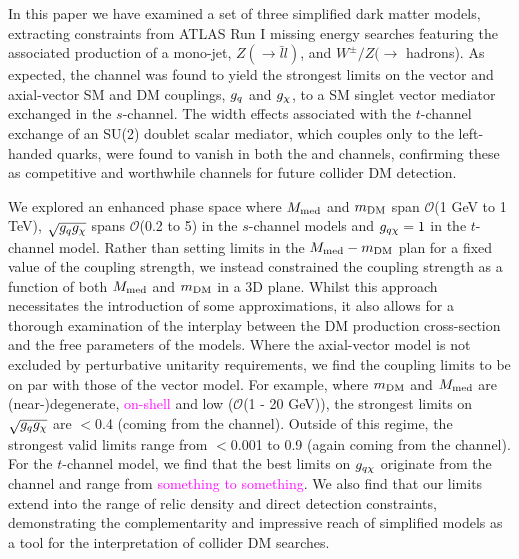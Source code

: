 
In this paper we have examined a set of three simplified dark matter models, extracting constraints from ATLAS Run I missing energy searches featuring the associated production of a mono-jet, $Z(\rightarrow \bar l l)$, and $W^\pm/Z (\rightarrow$ hadrons). As expected, the \monojet channel was found to yield the strongest limits on the vector and axial-vector SM and DM couplings, $g_q$ and $g_{\chi}$, to a SM singlet vector mediator exchanged in the $s$-channel. The width effects associated with the $t$-channel exchange of an SU(2) doublet scalar mediator, which couples only to the left-handed quarks, were found to vanish in both the \monoZ and \monoWZ channels, confirming these as competitive and worthwhile channels for future collider DM detection. 

We explored an enhanced phase space where $M_{\mathrm{med}}$ and $m_{\mathrm{DM}}$ span $\mathcal{O}$(1 GeV to 1 TeV), $\sqrt{g_qg_{\chi}}$ spans $\mathcal{O}$(0.2 to 5) in the $s$-channel models and $g_{q \chi}= 1$ in the $t$-channel model. Rather than setting limits in the $M_{\mathrm{med}} - m_{\mathrm{DM}}$ plan for a fixed value of the coupling strength, we instead constrained the coupling strength as a function of both $M_{\mathrm{med}}$ and $m_{\mathrm{DM}}$ in a 3D plane. Whilst this approach necessitates the introduction of some approximations, it also allows for a thorough examination of the interplay between the DM production cross-section and the free parameters of the models. Where the axial-vector model is not excluded by perturbative unitarity requirements, we find the coupling limits to be on par with those of the vector model. For example, where $m_{\mathrm{DM}}$ and $M_{\mathrm{med}}$ are (near-)degenerate, \textcolor{magenta}{on-shell} and low ($\mathcal{O}$(1 - 20 GeV)), the strongest limits on $\sqrt{g_qg_{\chi}}$ are $<$0.4 (coming from the \monojet channel). Outside of this regime, the strongest valid limits range from $<$0.001 to 0.9 (again coming from the \monojet channel). For the $t$-channel model, we find that the best limits on $g_{q \chi}$ originate from the \monoZ channel and range from \textcolor{magenta}{something to something}. We also find that our limits extend into the range of relic density and direct detection constraints, demonstrating the complementarity and impressive reach of simplified models as a tool for the  interpretation of collider DM searches.


